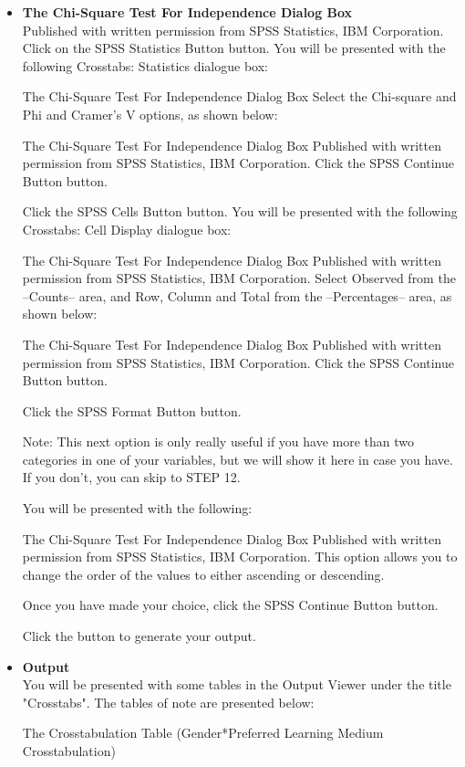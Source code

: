 \documentclass[]{report}
\begin{document}
\begin{itemize}
\item \textbf{The Chi-Square Test For Independence Dialog Box}\\
Published with written permission from SPSS Statistics, IBM Corporation.
Click on the SPSS Statistics Button button. You will be presented with the following Crosstabs: Statistics dialogue box:

The Chi-Square Test For Independence Dialog Box
Select the Chi-square and Phi and Cramer's V options, as shown below:

The Chi-Square Test For Independence Dialog Box
Published with written permission from SPSS Statistics, IBM Corporation.
Click the SPSS Continue Button button.

Click the SPSS Cells Button button. You will be presented with the following Crosstabs: Cell Display dialogue box:

The Chi-Square Test For Independence Dialog Box
Published with written permission from SPSS Statistics, IBM Corporation.
Select Observed from the –Counts– area, and Row, Column and Total from the –Percentages– area, as shown below:

The Chi-Square Test For Independence Dialog Box
Published with written permission from SPSS Statistics, IBM Corporation.
Click the SPSS Continue Button button.

Click the SPSS Format Button button.

Note: This next option is only really useful if you have more than two categories in one of your variables, but we will show it here in case you have. If you don't, you can skip to STEP 12.

You will be presented with the following:

The Chi-Square Test For Independence Dialog Box
Published with written permission from SPSS Statistics, IBM Corporation.
This option allows you to change the order of the values to either ascending or descending.

Once you have made your choice, click the SPSS Continue Button button.

Click the  button to generate your output.

\item \textbf{Output}\\
You will be presented with some tables in the Output Viewer under the title "Crosstabs". The tables of note are presented below:

The Crosstabulation Table (Gender*Preferred Learning Medium Crosstabulation)


\end{itemize}
\end{document}
